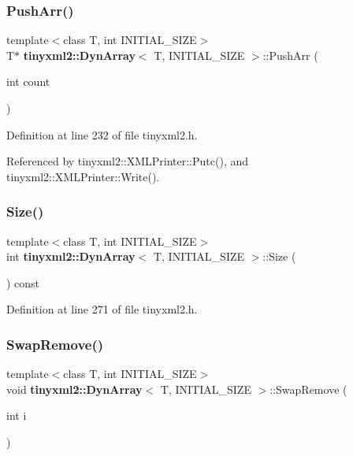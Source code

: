 \subsubsection{Push\+Arr()}
{\footnotesize\ttfamily template$<$class T, int I\+N\+I\+T\+I\+A\+L\+\_\+\+S\+I\+ZE$>$ \\
T$\ast$ \textbf{ tinyxml2\+::\+Dyn\+Array}$<$ T, I\+N\+I\+T\+I\+A\+L\+\_\+\+S\+I\+ZE $>$\+::Push\+Arr (\begin{DoxyParamCaption}\item[{int}]{count }\end{DoxyParamCaption})\hspace{0.3cm}{\ttfamily [inline]}}



Definition at line 232 of file tinyxml2.\+h.



Referenced by tinyxml2\+::\+X\+M\+L\+Printer\+::\+Putc(), and tinyxml2\+::\+X\+M\+L\+Printer\+::\+Write().

\mbox{\label{classtinyxml2_1_1_dyn_array_a67614d80847eb92cab330f1a5849a9a2}} 
\subsubsection{Size()}
{\footnotesize\ttfamily template$<$class T, int I\+N\+I\+T\+I\+A\+L\+\_\+\+S\+I\+ZE$>$ \\
int \textbf{ tinyxml2\+::\+Dyn\+Array}$<$ T, I\+N\+I\+T\+I\+A\+L\+\_\+\+S\+I\+ZE $>$\+::Size (\begin{DoxyParamCaption}{ }\end{DoxyParamCaption}) const\hspace{0.3cm}{\ttfamily [inline]}}



Definition at line 271 of file tinyxml2.\+h.

\mbox{\label{classtinyxml2_1_1_dyn_array_aa72c644f8b5e9ec5dab5b66c88f5665f}} 
\subsubsection{Swap\+Remove()}
{\footnotesize\ttfamily template$<$class T, int I\+N\+I\+T\+I\+A\+L\+\_\+\+S\+I\+ZE$>$ \\
void \textbf{ tinyxml2\+::\+Dyn\+Array}$<$ T, I\+N\+I\+T\+I\+A\+L\+\_\+\+S\+I\+ZE $>$\+::Swap\+Remove (\begin{DoxyParamCaption}\item[{int}]{i }\end{DoxyParamCaption})\hspace{0.3cm}{\ttfamily [inline]}}



